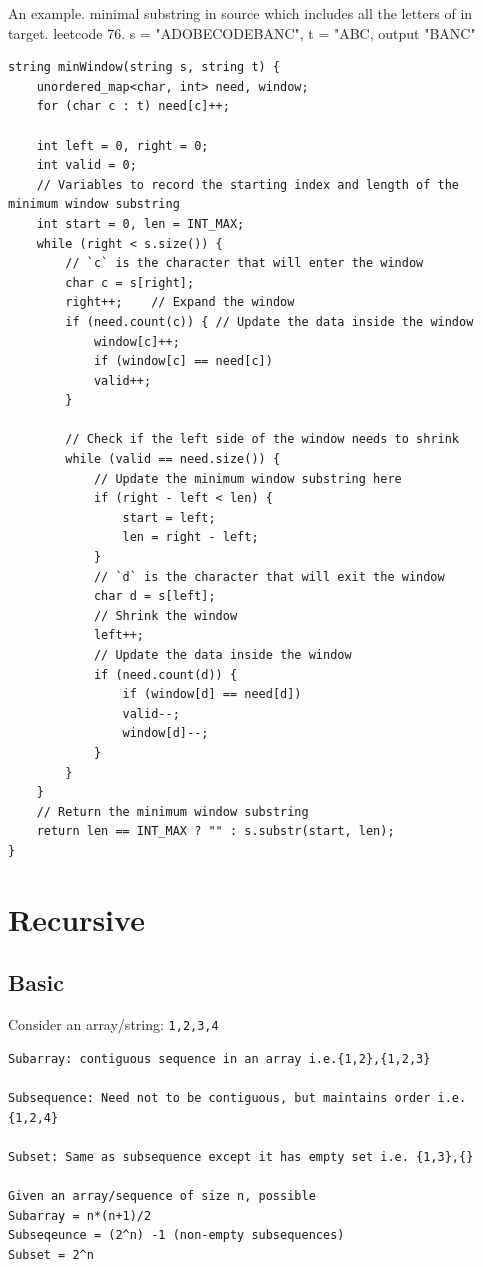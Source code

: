 \documentclass[a4paper,11pt,twoside]{book}
\begin{document}
	\par An example. minimal substring in source which includes all the letters of in target. leetcode 76.
	s = "ADOBECODEBANC", t = "ABC, output "BANC"
\begin{lstlisting}
string minWindow(string s, string t) { 
	unordered_map<char, int> need, window;
	for (char c : t) need[c]++;
	
	int left = 0, right = 0;
	int valid = 0;
	// Variables to record the starting index and length of the minimum window substring
	int start = 0, len = INT_MAX;
	while (right < s.size()) {
		// `c` is the character that will enter the window
		char c = s[right];
		right++; 	// Expand the window
		if (need.count(c)) { // Update the data inside the window
			window[c]++;
			if (window[c] == need[c])
			valid++;
		}
		
		// Check if the left side of the window needs to shrink
		while (valid == need.size()) {
			// Update the minimum window substring here
			if (right - left < len) {
				start = left;
				len = right - left;
			}
			// `d` is the character that will exit the window
			char d = s[left];
			// Shrink the window
			left++;
			// Update the data inside the window
			if (need.count(d)) {
				if (window[d] == need[d])
				valid--;
				window[d]--;
			}                    
		}
	}
	// Return the minimum window substring
	return len == INT_MAX ? "" : s.substr(start, len);
}
\end{lstlisting}
	

\section{Recursive}
\subsection{Basic}

	\par Consider an array/string: \texttt{{1,2,3,4}}
\begin{lstlisting}
Subarray: contiguous sequence in an array i.e.{1,2},{1,2,3}

Subsequence: Need not to be contiguous, but maintains order i.e. {1,2,4}

Subset: Same as subsequence except it has empty set i.e. {1,3},{}

Given an array/sequence of size n, possible
Subarray = n*(n+1)/2
Subseqeunce = (2^n) -1 (non-empty subsequences)
Subset = 2^n
\end{lstlisting}
	
\end{document}
